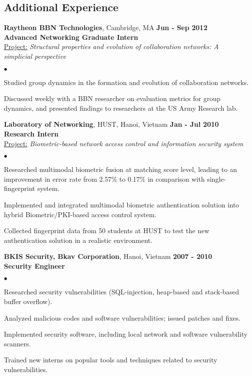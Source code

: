 \documentclass[margin,line]{res}
\newenvironment{list2}{
  \begin{list}{$\bullet$}{%
      \setlength{\itemsep}{0in}
      \setlength{\parsep}{0in} \setlength{\parskip}{0in}
      \setlength{\topsep}{0in} \setlength{\partopsep}{0in} 
      \setlength{\leftmargin}{0.2in}}}{\end{list}}
\begin{document}
\begin{resume}
\section{\sc Additional Experience}
{\bf Raytheon BBN Technologies}, Cambridge, MA  \hfill {\bf Jun - Sep 2012}
\\{\bf Advanced Networking Graduate Intern}
\\\underline{Project:} {\em Structural properties and evolution of collaboration networks: A simplicial perspective}
\begin{list2}
\item Studied group dynamics in the formation and evolution of collaboration networks.
\item Discussed weekly with a BBN researcher on evaluation metrics for group dynamics, and presented findings to researchers at the US Army Research lab.
\end{list2}
\vspace{-0.05in}
{\bf Laboratory of Networking}, HUST, Hanoi, Vietnam  \hfill {\bf Jan - Jul 2010}
\\{\bf Research Intern}
\\\underline{Project:} {\em Biometric-based network access control and information security system}
\begin{list2}
\item Researched multimodal biometric fusion at matching score level, leading to an improvement in error rate from 2.57\% to 0.17\% in comparison with single-fingerprint system.
\item Implemented and integrated multimodal biometric authentication solution into hybrid Biometric/PKI-based access control system.
\item Collected fingerprint data from 50 students at HUST to test the new authentication solution in a realistic environment.
\end{list2}
\vspace*{-0.05in}
{\bf BKIS Security, Bkav Corporation}, Hanoi, Vietnam \hfill {\bf 2007 - 2010}
\\{\bf Security Engineer}
\begin{list2}
\item Researched security vulnerabilities (SQL-injection, heap-based and stack-based buffer overflow).
\item Analyzed malicious codes and software vulnerabilities; issued patches and fixes.
\item Implemented security software, including local network and software vulnerability scanners.
\item Trained new interns on popular tools and techniques related to security vulnerabilities.
\end{list2}


\end{resume}
\end{document}

